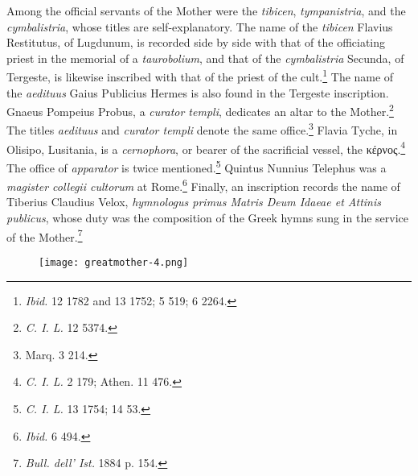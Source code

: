 \documentclass[a4paper, 11pt, oneside, polutonikogreek, english]{article}
\begin{document}
Among the official servants of the Mother were the \emph{tibicen}, \emph{tympanistria}, and the \emph{cymbalistria}, whose titles are self-explanatory. The name of the \emph{tibicen} Flavius Restitutus, of Lugdunum, is recorded side by side with that of the officiating priest in the memorial of a \emph{taurobolium}, and that of the \emph{cymbalistria} Secunda, of Tergeste, is likewise inscribed with that of the priest of the cult.\footnote{\emph{Ibid.} 12 1782 and 13 1752; 5 519; 6 2264.} The name of the \emph{aedituus} Gaius Publicius Hermes is also found in the Tergeste inscription. Gnaeus Pompeius Probus, a \emph{curator templi}, dedicates an altar to the Mother.\footnote{\emph{C. I. L.} 12 5374.} The titles \emph{aedituus} and \emph{curator templi} denote the same office.\footnote{Marq. 3 214.} Flavia Tyche, in Olisipo, Lusitania, is a \emph{cernophora}, or bearer of the sacrificial vessel, the κέρνος.\footnote{\emph{C. I. L.} 2 179; Athen. 11 476.} The office of \emph{apparator} is twice mentioned.\footnote{\emph{C. I. L.} 13 1754; 14 53.} Quintus Nunnius Telephus was a \emph{magister collegii cultorum} at Rome.\footnote{\emph{Ibid.} 6 494.} Finally, an inscription records the name of Tiberius Claudius Velox, \emph{hymnologus primus Matris Deum Idaeae et Attinis publicus}, whose duty was the composition of the Greek hymns sung in the service of the Mother.\footnote{\emph{Bull. dell' Ist.} 1884 p. 154.}

\begin{figure}[H]
\centering
\texttt{[image: greatmother-4.png]}
\caption{}
\end{figure}
\end{document}
